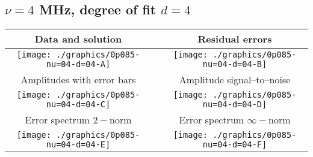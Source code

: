 

% 

\clearpage{}
\break{}

\subsection{$\nu = 4$ MHz, degree of fit $d = 4$}

\begin{table}[h]
    \begin{center}
        \begin{tabular}{ccc}
            Data and solution & \quad & Residual errors \\\hline
            \texttt{[image: ./graphics/0p085-nu=04-d=04-A]} &&
            \texttt{[image: ./graphics/0p085-nu=04-d=04-B]} \\[15pt]
            Amplitudes with error bars && Amplitude signal--to--noise \\\hline
            \texttt{[image: ./graphics/0p085-nu=04-d=04-C]} &&
            \texttt{[image: ./graphics/0p085-nu=04-d=04-D]} \\[15pt]
            Error spectrum $2-$norm && Error spectrum $\infty-$norm \\\hline
            \texttt{[image: ./graphics/0p085-nu=04-d=04-E]} &&
            \texttt{[image: ./graphics/0p085-nu=04-d=04-F]} \\[15pt]
        \end{tabular}
    \end{center}
\label{fig:elev=85, nu=4}
\end{table}



\endinput
